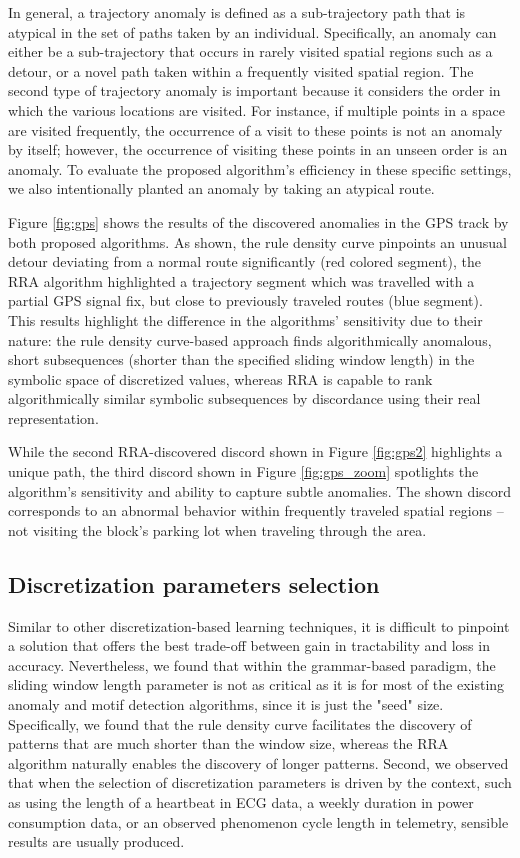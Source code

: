 \documentclass{sig-alternate}
\begin{document}
In general, a trajectory anomaly is defined as a sub-trajec\-tory path that is atypical in the set of paths taken by an individual. Specifically, an anomaly can either be a sub-trajectory that occurs in rarely visited spatial regions such as a detour, or a novel path taken within a frequently visited spatial region. The second type of trajectory anomaly is important because it considers the order in which the various locations are visited. For instance, if multiple points in a space are visited frequently, the occurrence of a visit to these points is not an anomaly by itself; however, the occurrence of visiting these points in an unseen order is an anomaly. To evaluate the proposed algorithm's efficiency in these specific settings, we also intentionally planted an anomaly by taking an atypical route.

Figure \ref{fig:gps} shows the results of the discovered anomalies in the GPS track by both proposed algorithms. As shown, the rule density curve pinpoints an unusual detour deviating from a normal route significantly (red colored segment), the RRA algorithm highlighted a trajectory segment which was travelled with a partial GPS signal fix, but close to previously traveled routes (blue segment). This results highlight the difference in the algorithms' sensitivity due to their nature: the rule density curve-based approach finds algorithmically anomalous, short subsequences (shorter than the specified sliding window length) in the symbolic space of discretized values, whereas RRA is capable to rank algorithmically similar symbolic subsequences by discordance using their real representation.

While the second RRA-discovered discord shown in Figure \ref{fig:gps2} highlights a unique path, the third discord shown in Figure \ref{fig:gps_zoom} spotlights the algorithm's sensitivity and ability to capture subtle anomalies. The shown discord corresponds to an abnormal behavior within frequently traveled spatial regions -- not visiting the block's parking lot when traveling through the area. 

\subsection{Discretization parameters selection}
Similar to other discretization-based learning techniques, it is difficult to pinpoint a solution that offers the best trade-off between gain in tractability and loss in accuracy. Nevertheless, we found that within the grammar-based paradigm, the sliding window length parameter is not as critical as it is for most of the existing anomaly and motif detection algorithms, since it is just the "seed" size. Specifically, we found that the rule density curve facilitates the discovery of patterns that are much shorter than the window size, whereas the RRA algorithm naturally enables the discovery of longer patterns. Second, we observed that when the selection of discretization parameters is driven by the context, such as using the length of a heartbeat in ECG data, a weekly duration in power consumption data, or an observed phenomenon cycle length in telemetry, sensible results are usually produced. 
\end{document}
